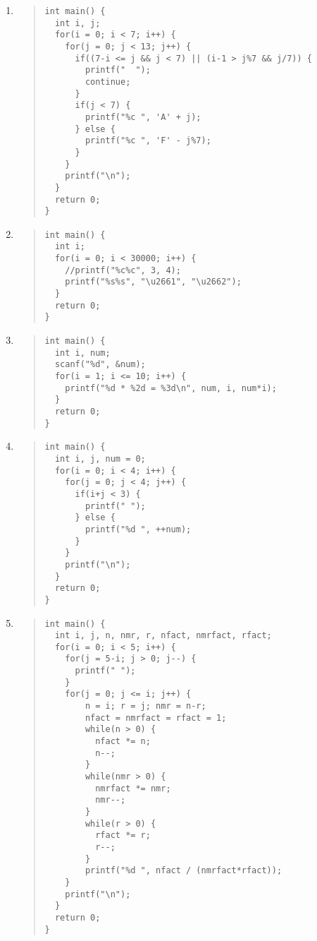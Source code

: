 \documentclass{report}
\begin{document}
\begin{enumerate}
  \item \begin{quote} \begin{verbatim} 
int main() {
  int i, j;
  for(i = 0; i < 7; i++) {
    for(j = 0; j < 13; j++) {
      if((7-i <= j && j < 7) || (i-1 > j%7 && j/7)) {
        printf("  ");
        continue;
      }
      if(j < 7) {
        printf("%c ", 'A' + j);
      } else {
        printf("%c ", 'F' - j%7);
      }
    }
    printf("\n");
  }
  return 0;
}
  \end{verbatim} \end{quote}

  \item \begin{quote} \begin{verbatim} 
int main() {
  int i;
  for(i = 0; i < 30000; i++) {
    //printf("%c%c", 3, 4);
    printf("%s%s", "\u2661", "\u2662");
  }
  return 0;
}
  \end{verbatim} \end{quote}

  \item \begin{quote} \begin{verbatim} 
int main() {
  int i, num;
  scanf("%d", &num);
  for(i = 1; i <= 10; i++) {
    printf("%d * %2d = %3d\n", num, i, num*i);
  }
  return 0;
}
  \end{verbatim} \end{quote}

  \item \begin{quote} \begin{verbatim} 
int main() {
  int i, j, num = 0;
  for(i = 0; i < 4; i++) {
    for(j = 0; j < 4; j++) {
      if(i+j < 3) {
        printf(" ");
      } else {
        printf("%d ", ++num);
      }
    }
    printf("\n");
  }
  return 0;
}
  \end{verbatim} \end{quote}

  \item \begin{quote} \begin{verbatim} 
int main() {
  int i, j, n, nmr, r, nfact, nmrfact, rfact;
  for(i = 0; i < 5; i++) {
    for(j = 5-i; j > 0; j--) {
      printf(" ");
    }
    for(j = 0; j <= i; j++) {
        n = i; r = j; nmr = n-r;
        nfact = nmrfact = rfact = 1;
        while(n > 0) {
          nfact *= n;
          n--;
        }
        while(nmr > 0) {
          nmrfact *= nmr;
          nmr--;
        }
        while(r > 0) {
          rfact *= r;
          r--;
        }
        printf("%d ", nfact / (nmrfact*rfact));
    }
    printf("\n");
  }
  return 0;
}
  \end{verbatim} \end{quote}


\end{enumerate}
\end{document}
